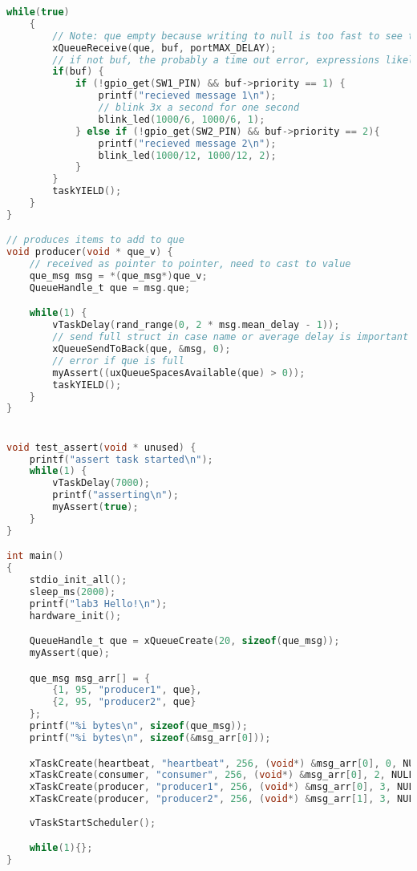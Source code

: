 \documentclass[sigconf]{article}
\begin{document}
\begin{lstlisting}[basicstyle=\footnotesize\ttfamily, language=c,breaklines]
    while(true)
    {
        // Note: que empty because writing to null is too fast to see things added to que
        xQueueReceive(que, buf, portMAX_DELAY);
        // if not buf, the probably a time out error, expressions likely incorrect though
        if(buf) { 
            if (!gpio_get(SW1_PIN) && buf->priority == 1) {
                printf("recieved message 1\n");
                // blink 3x a second for one second
                blink_led(1000/6, 1000/6, 1);
            } else if (!gpio_get(SW2_PIN) && buf->priority == 2){
                printf("recieved message 2\n");
                blink_led(1000/12, 1000/12, 2);
            }
        } 
        taskYIELD();
    }
}

// produces items to add to que
void producer(void * que_v) {
    // received as pointer to pointer, need to cast to value
    que_msg msg = *(que_msg*)que_v;
    QueueHandle_t que = msg.que;

    while(1) {
        vTaskDelay(rand_range(0, 2 * msg.mean_delay - 1));
        // send full struct in case name or average delay is important to consumer
        xQueueSendToBack(que, &msg, 0);
        // error if que is full
        myAssert((uxQueueSpacesAvailable(que) > 0));
        taskYIELD();
    }
}


void test_assert(void * unused) {
    printf("assert task started\n");
    while(1) {
        vTaskDelay(7000);
        printf("asserting\n");
        myAssert(true);
    }
}

int main()
{
    stdio_init_all();
    sleep_ms(2000);
    printf("lab3 Hello!\n");
    hardware_init();

    QueueHandle_t que = xQueueCreate(20, sizeof(que_msg));
    myAssert(que);

    que_msg msg_arr[] = {
        {1, 95, "producer1", que},
        {2, 95, "producer2", que}
    };
    printf("%i bytes\n", sizeof(que_msg));
    printf("%i bytes\n", sizeof(&msg_arr[0]));

    xTaskCreate(heartbeat, "heartbeat", 256, (void*) &msg_arr[0], 0, NULL);
    xTaskCreate(consumer, "consumer", 256, (void*) &msg_arr[0], 2, NULL);
    xTaskCreate(producer, "producer1", 256, (void*) &msg_arr[0], 3, NULL);
    xTaskCreate(producer, "producer2", 256, (void*) &msg_arr[1], 3, NULL);
    
    vTaskStartScheduler();

    while(1){};
}

\end{lstlisting}
\end{document}

